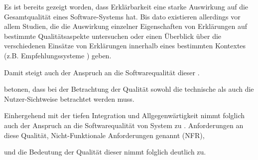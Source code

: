 Es ist bereits gezeigt worden, dass Erklärbarkeit eine starke Auswirkung auf die Gesamtqualität eines Software-Systems hat. Bis dato existieren allerdings vor allem Studien, die die Auswirkung einzelner Eigenschaften von Erklärungen auf bestimmte Qualitätsaspekte untersuchen oder einen Überblick über die verschiedenen Einsätze von Erklärungen innerhalb eines bestimmten Kontextes (z.B. Empfehlungssysteme \cite{nunes_systematic_2017}) geben.



\pagebreak

Damit steigt auch der Anspruch an die Softwarequalität dieser \cite{schneider2012abenteuer}. 


\citeauthor{ehsan_human-centered_2020} betonen, dass bei der Betrachtung der Qualität sowohl die technische als auch die Nutzer-Sichtweise betrachtet werden muss\cite{ehsan_human-centered_2020}. 

Einhergehend mit der tiefen Integration und Allgegenwärtigkeit nimmt folglich auch der Anspruch an die Softwarequalität von System zu \cite{schneider2012abenteuer}. Anforderungen an diese Qualität, \glqq Nicht-Funktionale Anforderungen genannt\grqq{} (NFR),

und die Bedeutung der Qualität dieser nimmt folglich deutlich zu. 

